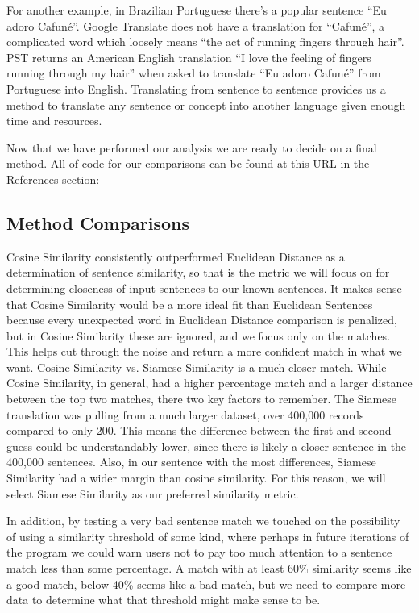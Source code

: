 \documentclass[runningheads]{llncs}
\begin{document}
	For another example, in Brazilian Portuguese there's a popular sentence ``Eu adoro Cafuné''. Google Translate does not have a translation for ``Cafuné'', a complicated word which loosely means ``the act of running fingers through hair''. PST returns an American English translation ``I love the feeling of fingers running through my hair'' when asked to translate ``Eu adoro Cafuné'' from Portuguese into English. Translating from sentence to sentence provides us a method to translate any sentence or concept into another language given enough time and resources.

	Now that we have performed our analysis we are ready to decide on a final method. All of code for our comparisons can be found at this URL in the References section: ~\cite{ref_url15}
	
	\subsection{Method Comparisons}
	Cosine Similarity consistently outperformed Euclidean Distance as a determination of sentence similarity, so that is the metric we will focus on for determining closeness of input sentences to our known sentences. It makes sense that Cosine Similarity would be a more ideal fit than Euclidean Sentences because every unexpected word in Euclidean Distance comparison is penalized, but in Cosine Similarity these are ignored, and we focus only on the matches. This helps cut through the noise and return a more confident match in what we want. 
	Cosine Similarity vs. Siamese Similarity is a much closer match. While Cosine Similarity, in general, had a higher percentage match and a larger distance between the top two matches, there two key factors to remember. The Siamese translation was pulling from a much larger dataset, over 400,000 records compared to only 200. This means the difference between the first and second guess could be understandably lower, since there is likely a closer sentence in the 400,000 sentences. Also, in our sentence with the most differences, Siamese Similarity had a wider margin than cosine similarity. For this reason, we will select Siamese Similarity as our preferred similarity metric.

	In addition, by testing a very bad sentence match we touched on the possibility of using a similarity threshold of some kind, where perhaps in future iterations of the program we could warn users not to pay too much attention to a sentence match less than some percentage. A match with at least 60\% similarity seems like a good match, below 40\% seems like a bad match, but we need to compare more data to determine what that threshold might make sense to be.
\end{document}
